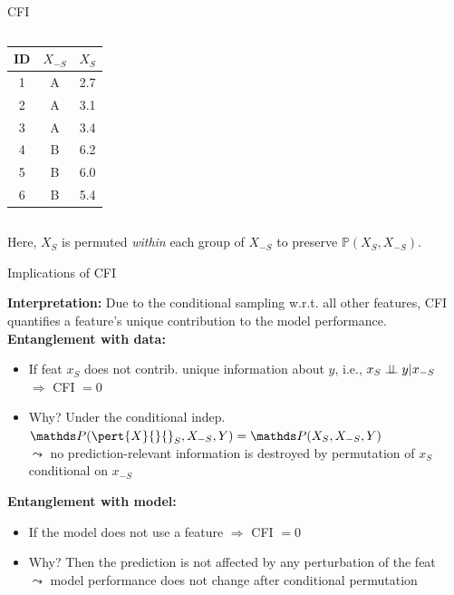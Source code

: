 \documentclass[10pt,compress,t,notes=noshow, xcolor=table]{beamer}
\begin{document}
\begin{frame}{CFI  }
\begin{columns}[T, onlytextwidth]
\begin{column}{0.5\textwidth}
    \begin{tabular}{ccc}
\toprule
ID & $X_{-S}$ & $X_S$ \\
\midrule
1 & \cellcolor{blue!10}A & \cellcolor{blue!10}2.7 \\
2 & \cellcolor{blue!10}A & \cellcolor{blue!10}3.1 \\
3 & \cellcolor{blue!10}A & \cellcolor{blue!10}3.4 \\
\midrule
4 & \cellcolor{red!10}B & \cellcolor{red!10}6.2 \\
5 & \cellcolor{red!10}B & \cellcolor{red!10}6.0 \\
6 & \cellcolor{red!10}B & \cellcolor{red!10}5.4 \\
\bottomrule
\end{tabular}
    \end{column}
\end{columns}


\medskip
{
Here, $X_S$ is permuted \textit{within} each group of $X_{-S}$ to preserve $\mathbb{P}(X_S, X_{-S})$.
}


\end{frame}


\begin{frame}{Implications of CFI }

\textbf{Interpretation:} Due to the conditional sampling w.r.t. all other features, CFI quantifies a feature's unique contribution to the model performance.\\
\lz\pause
\textbf{Entanglement with data:}
\begin{itemize}
  \item If feat $x_S$ does not contrib. unique information about $y$, i.e., $x_S \perp \!\!\! \perp y | x_{-S}$\\
  $\Rightarrow$ CFI $= 0$
  \item Why? Under the conditional indep. 
  $\P(\pert{X}{}{}_S, X_{-S}, Y) = \P(X_S, X_{-S}, Y)$
  \\
  $\leadsto$ no prediction-relevant information is destroyed by permutation of $x_S$ conditional on $x_{-S}$
\end{itemize}
\lz\pause
\textbf{Entanglement with model:}
\begin{itemize}
  \item If the model does not use a feature $\Rightarrow$ CFI $= 0$
  \item Why? Then the prediction is not affected by any perturbation of the feat\\
  $\leadsto$ model performance does not change after conditional permutation
\end{itemize}

\end{frame}
\end{document}
